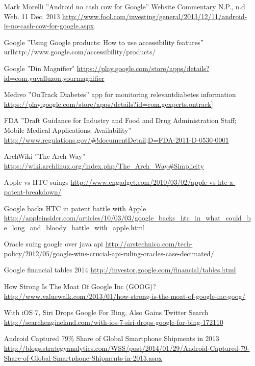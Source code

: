 \documentclass[conference]{IEEEtran}
\begin{document}
\begin{thebibliography}{1}
Mark Morelli ''Android no cash cow for Google'' Website Commentary N.P., n.d Web. 11 Dec. 2013 \url{http://www.fool.com/investing/general/2013/12/11/android-is-no-cash-cow-for-google.aspx}.

Google ''Using Google products: How to use accessibility features'' url{http://www.google.com/accessibility/products/}

Google ''Din Magnifier" \url{https://play.google.com/store/apps/details?id=com.yuvalluzon.yourmagnifier}

Medivo ''OnTrack Diabetes'' app for monitoring relevantdiabetes information
\url{https://play.google.com/store/apps/details?id=com.gexperts.ontrack]}

FDA ''Draft Guidance for Industry and Food and Drug Administration Staff; Mobile Medical Applications; Availability''
\url{http://www.regulations.gov/#!documentDetail;D=FDA-2011-D-0530-0001}

ArchWiki ''The Arch Way'' \url{https://wiki.archlinux.org/index.php/The\_Arch\_Way#Simplicity}

Apple vs HTC suings
\url{http://www.engadget.com/2010/03/02/apple-vs-htc-a-patent-breakdown/}

Google backs HTC in patent battle with Apple
\url{http://appleinsider.com/articles/10/03/03/google_backs_htc_in_what_could_be_long_and_bloody_battle_with_apple.html}

Oracle suing google over java api
\url{http://arstechnica.com/tech-policy/2012/05/google-wins-crucial-api-ruling-oracles-case-decimated/}

Google financial tables 2014
\url{http://investor.google.com/financial/tables.html}

How Strong Is The Moat Of Google Inc (GOOG)?
\url{http://www.valuewalk.com/2013/01/how-strong-is-the-moat-of-google-inc-goog/}

With iOS 7, Siri Drops Google For Bing, Also Gains Twitter Search
\url{http://searchengineland.com/with-ios-7-siri-drops-google-for-bing-172110}

Android Captured 79\% Share of Global Smartphone Shipments in 2013
\url{http://blogs.strategyanalytics.com/WSS/post/2014/01/29/Android-Captured-79-Share-of-Global-Smartphone-Shipments-in-2013.aspx}


\end{thebibliography}
\end{document}
